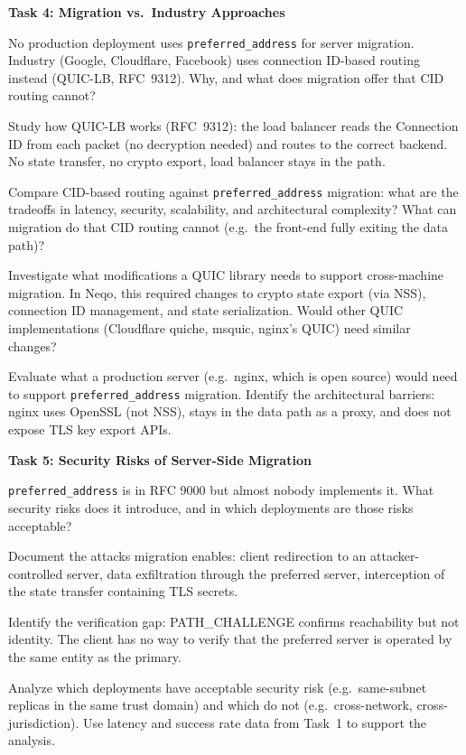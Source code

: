 \documentclass[11pt]{article}
\begin{document}
\bigskip
\textbf{Task 4: Migration vs.\ Industry Approaches}

No production deployment uses \texttt{preferred\_address} for server migration. Industry (Google, Cloudflare, Facebook) uses connection ID-based routing instead (QUIC-LB, RFC~9312). Why, and what does migration offer that CID routing cannot?

\begin{tasklist}
\item[4a.] Study how QUIC-LB works (RFC~9312): the load balancer reads the Connection ID from each packet (no decryption needed) and routes to the correct backend. No state transfer, no crypto export, load balancer stays in the path.
\item[4b.] Compare CID-based routing against \texttt{preferred\_address} migration: what are the tradeoffs in latency, security, scalability, and architectural complexity? What can migration do that CID routing cannot (e.g.\ the front-end fully exiting the data path)?
\item[4c.] Investigate what modifications a QUIC library needs to support cross-machine migration. In Neqo, this required changes to crypto state export (via NSS), connection ID management, and state serialization. Would other QUIC implementations (Cloudflare quiche, msquic, nginx's QUIC) need similar changes?
\item[4d.] Evaluate what a production server (e.g.\ nginx, which is open source) would need to support \texttt{preferred\_address} migration. Identify the architectural barriers: nginx uses OpenSSL (not NSS), stays in the data path as a proxy, and does not expose TLS key export APIs.
\end{tasklist}

\bigskip
\textbf{Task 5: Security Risks of Server-Side Migration}

\texttt{preferred\_address} is in RFC 9000 but almost nobody implements it. What security risks does it introduce, and in which deployments are those risks acceptable?

\begin{tasklist}
\item[5a.] Document the attacks migration enables: client redirection to an attacker-controlled server, data exfiltration through the preferred server, interception of the state transfer containing TLS secrets.
\item[5b.] Identify the verification gap: PATH\_CHALLENGE confirms reachability but not identity. The client has no way to verify that the preferred server is operated by the same entity as the primary.
\item[5c.] Analyze which deployments have acceptable security risk (e.g.\ same-subnet replicas in the same trust domain) and which do not (e.g.\ cross-network, cross-jurisdiction). Use latency and success rate data from Task~1 to support the analysis.
\end{tasklist}
\end{document}
